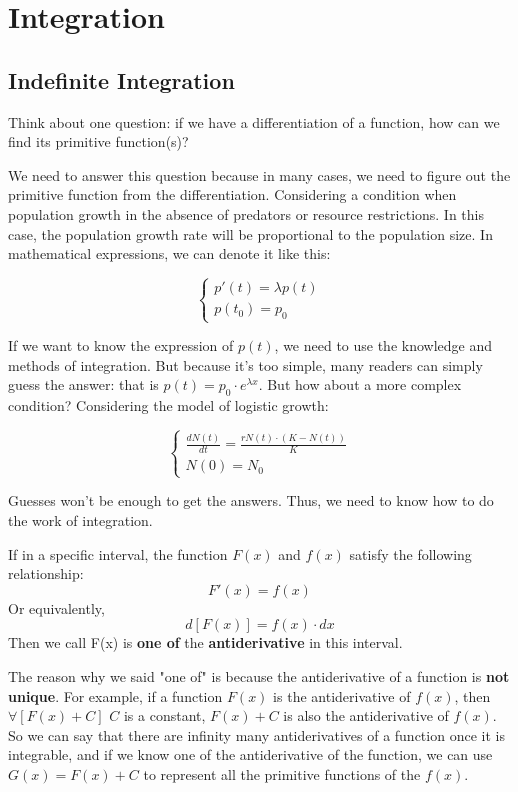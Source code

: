 \documentclass[oneside]{book}
\begin{document}
\section{Integration}

\subsection{Indefinite Integration}
Think about one question: if we have a differentiation of a function, how can we find its primitive function(s)?

We need to answer this question because in many cases, we need to figure out the primitive function from the differentiation. Considering a condition when population growth in the absence of predators or resource restrictions. In this case, the population growth rate will be proportional to the population size. In mathematical expressions, we can denote it like this:

\[
\begin{cases}
    p'(t) = \lambda p(t) \\
    p(t_0) = p_0
\end{cases}
\]

If we want to know the expression of $p(t)$, we need to use the knowledge and methods of integration. But because it's too simple, many readers can simply guess the answer: that is $p(t)=p_0 \cdot e^{\lambda x}$. But how about a more complex condition? Considering the model of logistic growth:

\[
\begin{cases}
    \frac{dN(t)}{dt} = \frac{rN(t) \cdot (K-N(t))}{K} \\
    N(0) = N_0
\end{cases}
\]

Guesses won't be enough to get the answers. Thus, we need to know how to do the work of integration.

\begin{definition}
If in a specific interval, the function $F(x)$ and $f(x)$ satisfy the following relationship:
\[F'(x) = f(x)\]
Or equivalently,
\[d[F(x)]=f(x)\cdot dx\]
Then we call F(x) is \textbf{one of} the \textbf{antiderivative} in this interval.
\end{definition}

The reason why we said "one of" is because the antiderivative of a function is \textbf{not unique}. For example, if a function $F(x)$ is the antiderivative of $f(x)$, then $\forall [F(x)+C]$ $C$ is a constant,
$F(x)+C$ is also the antiderivative of $f(x)$. So we can say that there are infinity many antiderivatives of a function once it is integrable, and if we know one of the antiderivative of the function, we can use $G(x) = F(x)+C$ to represent all the primitive functions of the $f(x)$.
\end{document}

